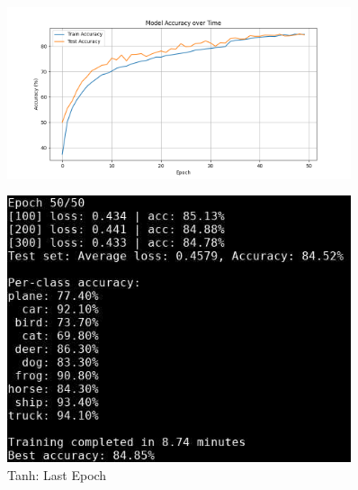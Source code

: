 \documentclass{beamer}
\begin{document}
\begin{frame}
\begin{columns}
    \begin{column}{0.5\textwidth}
        \begin{figure}[t]
            \centering
            \vspace{-0.4cm}
            \includegraphics[width=0.9\textwidth]{media/cifar10_cnn_tanh_accuracy.png}
        \end{figure}
        \vspace{-0.8cm}
        \begin{figure}[t]
            \centering
            \includegraphics[width=0.9\textwidth]{media/cnn_tanh_epoch_50.png}
            \vspace{-0.3cm}
            \caption{Tanh: Last Epoch}
        \end{figure}
    \end{column}    
\end{columns}
\end{frame}
\end{document}
